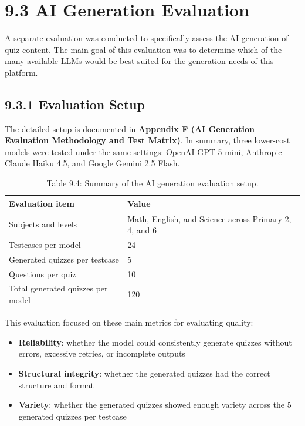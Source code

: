 \documentclass[
  12pt,
  a4paper,
]{report}
\begin{document}
\hypertarget{ai-generation-evaluation}{%
\section{9.3 AI Generation Evaluation}\label{ai-generation-evaluation}}

A separate evaluation was conducted to specifically assess the AI
generation of quiz content. The main goal of this evaluation was to
determine which of the many available LLMs would be best suited for the
generation needs of this platform.

\hypertarget{evaluation-setup-and-model-matrix}{%
\subsection{9.3.1 Evaluation Setup}\label{evaluation-setup-and-model-matrix}}

The detailed setup is documented in \textbf{Appendix F (AI Generation
Evaluation Methodology and Test Matrix)}. In summary, three lower-cost
models were tested under the same settings: OpenAI GPT-5 mini,
Anthropic Claude Haiku 4.5, and Google Gemini 2.5 Flash.

\begin{table}[H]
\centering
\small
\begin{tabular}{@{}p{}p{}@{}}
\toprule
Evaluation item & Value \\
\midrule
Subjects and levels & Math, English, and Science across Primary 2, 4, and 6 \\
Testcases per model & 24 \\
Generated quizzes per testcase & 5 \\
Questions per quiz & 10 \\
Total generated quizzes per model & 120 \\
\bottomrule
\end{tabular}

\caption*{Table 9.4: Summary of the AI generation evaluation setup.}
\end{table}


This evaluation focused on these main metrics for evaluating quality:

\begin{itemize}
\item \textbf{Reliability}: whether the model could consistently generate quizzes without errors, excessive retries, or incomplete outputs
\item \textbf{Structural integrity}: whether the generated quizzes had the correct structure and format
\item \textbf{Variety}: whether the generated quizzes showed enough variety across the 5 generated quizzes per testcase
\end{itemize}
\end{document}
